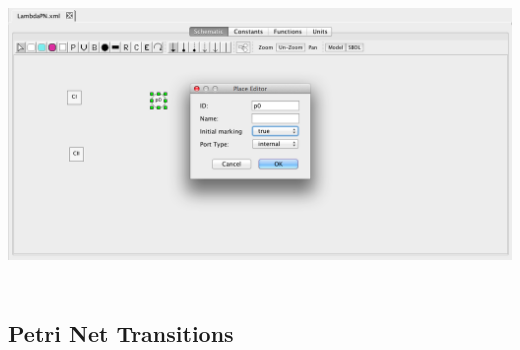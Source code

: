 \documentclass[titlepage,11pt]{article}
\begin{document}
\begin{center}
\includegraphics[height=80mm]{screenshots/place}
\end{center}

\subsection{\label{Transitions}Petri Net Transitions}
\end{document}
